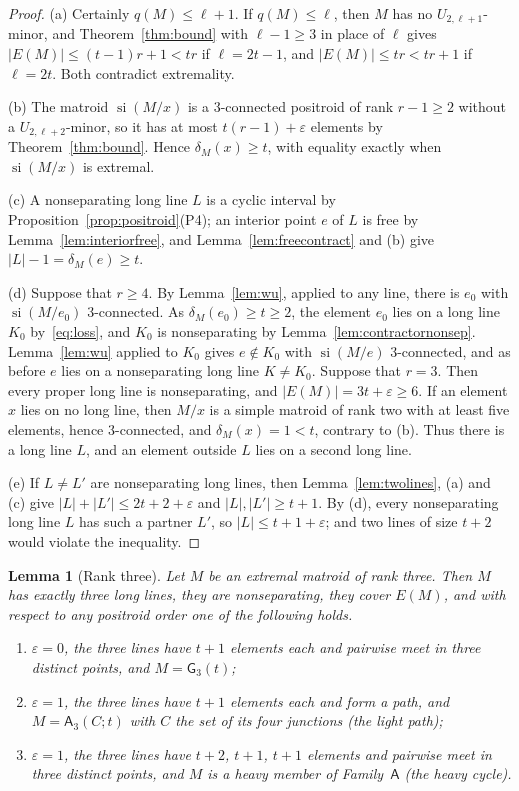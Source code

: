 \documentclass[11pt]{amsart}
\newtheorem{lemma}[theorem]{Lemma}
\theoremstyle{definition}
\theoremstyle{remark}
\numberwithin{equation}{section}
\newcommand{\si}{\operatorname{si}}
\newcommand{\GW}{\mathsf{G}}
\newcommand{\FA}{\mathsf{A}}
\begin{document}
\begin{proof}
(a) Certainly $q(M)\le\ell+1$. If $q(M)\le\ell$, then $M$ has no $U_{2,\ell+1}$-minor, and Theorem~\ref{thm:bound} with $\ell-1\ge3$ in place of $\ell$ gives $|E(M)|\le(t-1)r+1<tr$ if $\ell=2t-1$, and $|E(M)|\le tr<tr+1$ if $\ell=2t$. Both contradict extremality.

(b) The matroid $\si(M/x)$ is a $3$-connected positroid of rank $r-1\ge2$ without a $U_{2,\ell+2}$-minor, so it has at most $t(r-1)+\varepsilon$ elements by Theorem~\ref{thm:bound}. Hence $\delta_M(x)\ge t$, with equality exactly when $\si(M/x)$ is extremal.

(c) A nonseparating long line $L$ is a cyclic interval by Proposition~\ref{prop:positroid}(P4); an interior point $e$ of $L$ is free by Lemma~\ref{lem:interiorfree}, and Lemma~\ref{lem:freecontract} and (b) give $|L|-1=\delta_M(e)\ge t$.

(d) Suppose that $r\ge4$. By Lemma~\ref{lem:wu}, applied to any line, there is $e_0$ with $\si(M/e_0)$ $3$-connected. As $\delta_M(e_0)\ge t\ge2$, the element $e_0$ lies on a long line $K_0$ by~\eqref{eq:loss}, and $K_0$ is nonseparating by Lemma~\ref{lem:contractornonsep}. Lemma~\ref{lem:wu} applied to $K_0$ gives $e\notin K_0$ with $\si(M/e)$ $3$-connected, and as before $e$ lies on a nonseparating long line $K\ne K_0$. Suppose that $r=3$. Then every proper long line is nonseparating, and $|E(M)|=3t+\varepsilon\ge6$. If an element $x$ lies on no long line, then $M/x$ is a simple matroid of rank two with at least five elements, hence $3$-connected, and $\delta_M(x)=1<t$, contrary to (b). Thus there is a long line $L$, and an element outside $L$ lies on a second long line.

(e) If $L\ne L'$ are nonseparating long lines, then Lemma~\ref{lem:twolines}, (a) and (c) give $|L|+|L'|\le 2t+2+\varepsilon$ and $|L|,|L'|\ge t+1$. By (d), every nonseparating long line $L$ has such a partner $L'$, so $|L|\le t+1+\varepsilon$; and two lines of size $t+2$ would violate the inequality.
\end{proof}

\begin{lemma}[Rank three]\label{lem:rank3}
Let $M$ be an extremal matroid of rank three. Then $M$ has exactly three long lines, they are nonseparating, they cover $E(M)$, and with respect to any positroid order one of the following holds.
\begin{enumerate}[label=\textup{(\roman*)}]
\item $\varepsilon=0$, the three lines have $t+1$ elements each and pairwise meet in three distinct points, and $M=\GW_3(t)$;
\item $\varepsilon=1$, the three lines have $t+1$ elements each and form a path, and $M=\FA_3(C;t)$ with $C$ the set of its four junctions \textup{(}the \emph{light path}\textup{)};
\item $\varepsilon=1$, the three lines have $t+2$, $t+1$, $t+1$ elements and pairwise meet in three distinct points, and $M$ is a heavy member of Family~$\FA$ \textup{(}the \emph{heavy cycle}\textup{)}.
\end{enumerate}
\end{lemma}
\end{document}
